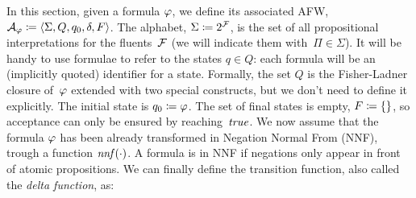 In this section, given a \ldl{} formula $\varphi$, we define its associated
AFW, $\mathcal{A}_\varphi \coloneqq \langle \Sigma, Q, q_0, \delta, F
\rangle$. The alphabet, $\Sigma \coloneqq 2^{\mathcal{F}}$, is the set of all
propositional interpretations for the fluents~$\mathcal{F}$ (we will indicate
them with~$\Pi \in \Sigma$). It will be handy to use \ldl{} formulae to refer
to the states $q \in Q$: each formula will be an (implicitly quoted)
identifier for a state. Formally, the set $Q$ is the Fisher-Ladner closure
of~$\varphi$ extended with two special constructs, but we don't need to
define it explicitly. The initial state is $q_0 \coloneqq \varphi$. The set
of final states is empty, $F \coloneqq \{\}$, so acceptance can only be
ensured by reaching~$\text{\textit{true}}$. We now assume that the formula $\varphi$ has
been already transformed in Negation Normal From
(NNF), trough a function
$\text{\textit{nnf}}(\cdot)$. A formula is in NNF if negations only appear in front of
atomic propositions. We can finally define the transition function, also
called the \emph{delta function}, as:
\begingroup
\allowdisplaybreaks

